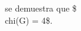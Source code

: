 \documentclass[preview]{standalone}
\begin{document}
\begin{center}
se demuestra que \$\\chi(G) = 4\$.
\end{center}
\end{document}
